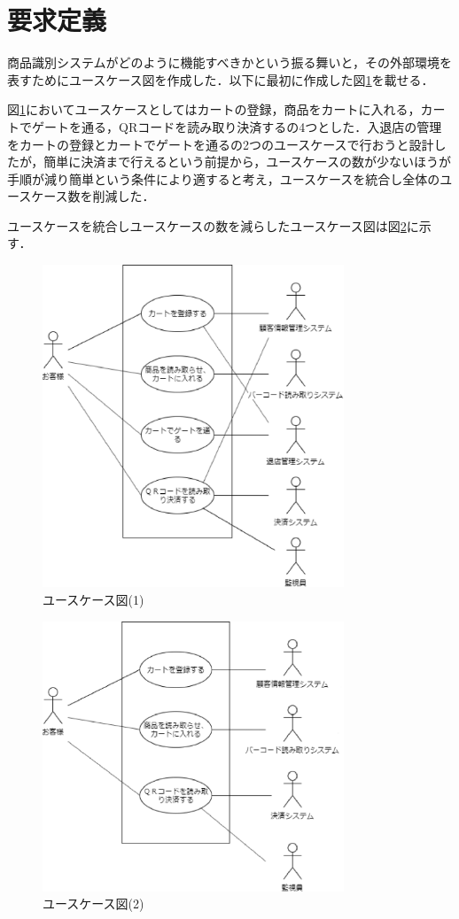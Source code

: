 

\section{要求定義}


商品識別システムがどのように機能すべきかという振る舞いと，その外部環境を表すためにユースケース図を作成した．以下に最初に作成した図\ref{usecase1}を載せる．

図\ref{usecase1}においてユースケースとしてはカートの登録，商品をカートに入れる，カートでゲートを通る，QRコードを読み取り決済するの4つとした．入退店の管理をカートの登録とカートでゲートを通るの2つのユースケースで行おうと設計したが，簡単に決済まで行えるという前提から，ユースケースの数が少ないほうが手順が減り簡単という条件により適すると考え，ユースケースを統合し全体のユースケース数を削減した．

ユースケースを統合しユースケースの数を減らしたユースケース図は図\ref{usecase2}に示す．

\begin{figure}[htbp]
\centering
\includegraphics[width = 9cm]{./picture/usecase1.eps}
\caption{ユースケース図(1)}
\label{usecase1}
\end{figure}

\begin{figure}[htbp]
\centering
\includegraphics[width = 9cm]{./picture/usecase2.eps}
\caption{ユースケース図(2)}
\label{usecase2}
\end{figure}

